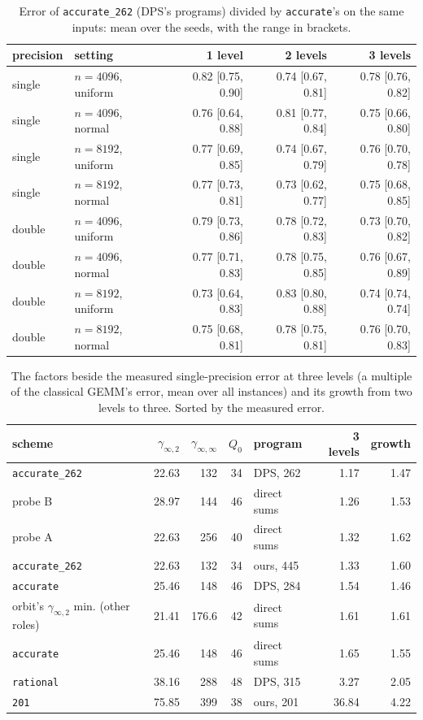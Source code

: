 \begin{table}[t]
\centering
\caption{Error of \texttt{accurate\_262} (DPS's programs) divided by \texttt{accurate}'s on the same inputs: mean over the seeds, with the range in brackets.}
\label{tab:ratio}
\small
\begin{tabular}{llrrr}
\toprule
precision & setting & 1 level & 2 levels & 3 levels\\
\midrule
single & $n=4096$, uniform & 0.82 [0.75, 0.90] & 0.74 [0.67, 0.81] & 0.78 [0.76, 0.82]\\
single & $n=4096$, normal & 0.76 [0.64, 0.88] & 0.81 [0.77, 0.84] & 0.75 [0.66, 0.80]\\
single & $n=8192$, uniform & 0.77 [0.69, 0.85] & 0.74 [0.67, 0.79] & 0.76 [0.70, 0.78]\\
single & $n=8192$, normal & 0.77 [0.73, 0.81] & 0.73 [0.62, 0.77] & 0.75 [0.68, 0.85]\\
double & $n=4096$, uniform & 0.79 [0.73, 0.86] & 0.78 [0.72, 0.83] & 0.73 [0.70, 0.82]\\
double & $n=4096$, normal & 0.77 [0.71, 0.83] & 0.78 [0.75, 0.85] & 0.76 [0.67, 0.89]\\
double & $n=8192$, uniform & 0.73 [0.64, 0.83] & 0.83 [0.80, 0.88] & 0.74 [0.74, 0.74]\\
double & $n=8192$, normal & 0.75 [0.68, 0.81] & 0.78 [0.75, 0.81] & 0.76 [0.70, 0.83]\\
\bottomrule
\end{tabular}
\end{table}

\begin{table}[t]
\centering
\caption{The factors beside the measured single-precision error at three levels (a multiple of the classical GEMM's error, mean over all instances) and its growth from two levels to three.  Sorted by the measured error.}
\label{tab:factors}
\small
\begin{tabular}{lrrrlrr}
\toprule
scheme & $\gamma_{\infty,2}$ & $\gamma_{\infty,\infty}$ & $Q_0$ & program & 3 levels & growth\\
\midrule
\texttt{accurate\_262} & 22.63 & 132 & 34 & DPS, 262 & 1.17 & 1.47\\
probe B & 28.97 & 144 & 46 & direct sums & 1.26 & 1.53\\
probe A & 22.63 & 256 & 40 & direct sums & 1.32 & 1.62\\
\texttt{accurate\_262} & 22.63 & 132 & 34 & ours, 445 & 1.33 & 1.60\\
\texttt{accurate} & 25.46 & 148 & 46 & DPS, 284 & 1.54 & 1.46\\
orbit's $\gamma_{\infty,2}$ min. (other roles) & 21.41 & 176.6 & 42 & direct sums & 1.61 & 1.61\\
\texttt{accurate} & 25.46 & 148 & 46 & direct sums & 1.65 & 1.55\\
\texttt{rational} & 38.16 & 288 & 48 & DPS, 315 & 3.27 & 2.05\\
\texttt{201} & 75.85 & 399 & 38 & ours, 201 & 36.84 & 4.22\\
\bottomrule
\end{tabular}
\end{table}

